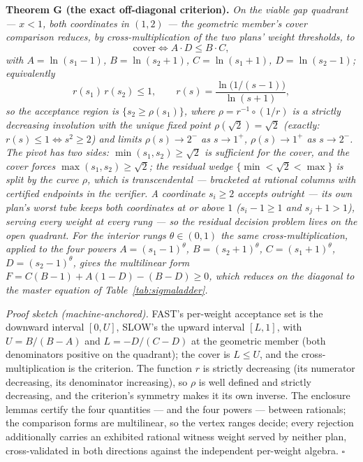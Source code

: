 \documentclass[3p,11pt]{elsarticle}
\begin{document}
\textbf{Theorem G (the exact off-diagonal criterion).} \emph{On
the viable gap quadrant --- \(x < 1\), both coordinates in
\((1, 2)\) --- the geometric member's cover comparison reduces,
by cross-multiplication of the two plans' weight thresholds, to}
\[
\mathrm{cover} \iff A \cdot D \le B \cdot C,
\]
\emph{with \(A = \ln(s_1 - 1)\), \(B = \ln(s_2 + 1)\),
\(C = \ln(s_1 + 1)\), \(D = \ln(s_2 - 1)\); equivalently}
\[
r(s_1)\, r(s_2) \le 1, \qquad r(s) = \frac{\ln\bigl(1/(s-1)\bigr)}{\ln(s+1)},
\]
\emph{so the acceptance region is \(\{ s_2 \ge \rho(s_1) \}\),
where \(\rho = r^{-1} \circ (1/r)\) is a strictly decreasing
involution with the unique fixed point \(\rho(\sqrt{2}) =
\sqrt{2}\) (exactly: \(r(s) \le 1 \iff s^2 \ge 2\)) and limits
\(\rho(s) \to 2^-\) as \(s \to 1^+\), \(\rho(s) \to 1^+\) as
\(s \to 2^-\). The pivot has two sides: \(\min(s_1, s_2) \ge
\sqrt{2}\) is sufficient for the cover, and the cover forces
\(\max(s_1, s_2) \ge \sqrt{2}\); the residual wedge \(\{\min <
\sqrt{2} < \max\}\) is split by the curve \(\rho\), which is
transcendental --- bracketed at rational columns with certified
endpoints in the verifier. A coordinate \(s_i \ge 2\) accepts
outright --- its own plan's worst tube keeps both coordinates at
or above \(1\) (\(s_i - 1 \ge 1\) and \(s_j + 1 > 1\)), serving
every weight at every rung --- so the residual decision problem
lives on the open quadrant. For the interior rungs \(\theta \in
(0, 1)\) the same cross-multiplication, applied to the four
powers \(A = (s_1 - 1)^\theta\), \(B = (s_2 + 1)^\theta\),
\(C = (s_1 + 1)^\theta\), \(D = (s_2 - 1)^\theta\), gives the
multilinear form \(F = C (B - 1) + A (1 - D) - (B - D) \ge 0\),
which reduces on the diagonal to the master equation of
Table~\ref{tab:sigmaladder}.}

\emph{Proof sketch (machine-anchored).} FAST's per-weight
acceptance set is the downward interval \([0, U]\), SLOW's the
upward interval \([L, 1]\), with \(U = B/(B - A)\) and \(L =
-D/(C - D)\) at the geometric member (both denominators positive
on the quadrant); the cover is \(L \le U\), and the
cross-multiplication is the criterion. The function \(r\) is
strictly decreasing (its numerator decreasing, its denominator
increasing), so \(\rho\) is well defined and strictly decreasing,
and the criterion's symmetry makes it its own inverse. The
enclosure lemmas certify the four quantities --- and the four
powers --- between rationals; the comparison forms are
multilinear, so the vertex ranges decide; every rejection
additionally carries an exhibited rational witness weight served
by neither plan, cross-validated in both directions against the
independent per-weight algebra. \ensuremath{\square}
\end{document}
